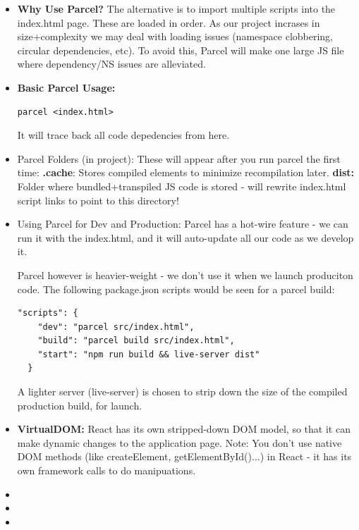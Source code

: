 \documentclass[8pt,a4paper]{extarticle}
\begin{document}
\begin{itemize}
\item \textbf{Why Use Parcel?} The alternative is to import multiple scripts into the index.html page. These are loaded in order. As our project incrases in size+complexity we may deal with loading issues (namespace clobbering, circular dependencies, etc). To avoid this, Parcel will make one large JS file where dependency/NS issues are alleviated.

\item \textbf{Basic Parcel Usage:}

\begin{verbatim}
parcel <index.html>
\end{verbatim}

It will trace back all code depedencies from here.
 
\item Parcel Folders (in project): These will appear after you run parcel the first time:
\mitem \textbf{.cache}: Stores compiled elements to minimize recompilation later.
\mitem \textbf{dist:} Folder where bundled+transpiled JS code is stored - will rewrite index.html script links to point to this directory!
\item Using Parcel for Dev and Production: Parcel has a hot-wire feature - we can run it with the index.html, and it will auto-update all our code as we develop it.

Parcel however is heavier-weight - we don't use it when we launch produciton code. The following package.json scripts would be seen for a parcel build:

\begin{verbatim}
"scripts": {
    "dev": "parcel src/index.html",
    "build": "parcel build src/index.html",
    "start": "npm run build && live-server dist"
  }
\end{verbatim}

A lighter server (live-server) is chosen to strip down the size of the compiled production build, for launch.

\item \textbf{VirtualDOM:} React has its own stripped-down DOM model, so that it can make dynamic changes to the application page. Note: You don't use native DOM methods (like createElement, getElementById()...) in React - it has its own framework calls to do manipuations.
\item
\item
\item
\end{itemize}
\end{document}
